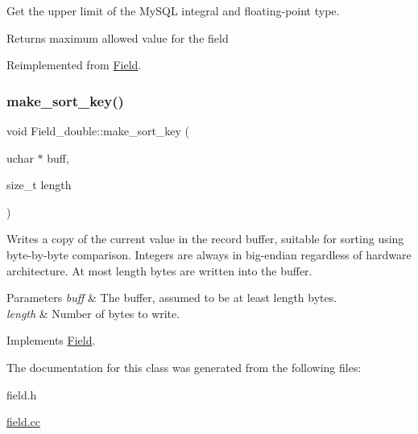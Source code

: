 Get the upper limit of the My\+S\+QL integral and floating-\/point type.

\begin{DoxyReturn}{Returns}
maximum allowed value for the field 
\end{DoxyReturn}


Reimplemented from \mbox{\hyperlink{classField_a22f18fbe3224a5ac4f23a90523b09087}{Field}}.

\mbox{\label{classField__double_a624c276b59ae696a33b583ae689fcbcc}} 
\subsubsection{\texorpdfstring{make\+\_\+sort\+\_\+key()}{make\_sort\_key()}}
{\footnotesize\ttfamily void Field\+\_\+double\+::make\+\_\+sort\+\_\+key (\begin{DoxyParamCaption}\item[{uchar $\ast$}]{buff,  }\item[{size\+\_\+t}]{length }\end{DoxyParamCaption})\hspace{0.3cm}{\ttfamily [virtual]}}

Writes a copy of the current value in the record buffer, suitable for sorting using byte-\/by-\/byte comparison. Integers are always in big-\/endian regardless of hardware architecture. At most length bytes are written into the buffer.


\begin{DoxyParams}{Parameters}
{\em buff} & The buffer, assumed to be at least length bytes.\\
\hline
{\em length} & Number of bytes to write. \\
\hline
\end{DoxyParams}


Implements \mbox{\hyperlink{classField_af3bc27d237b6ae6ef3dc7a2aec3d79ac}{Field}}.



The documentation for this class was generated from the following files\+:\begin{DoxyCompactItemize}
\item 
field.\+h\item 
\mbox{\hyperlink{field_8cc}{field.\+cc}}\end{DoxyCompactItemize}
